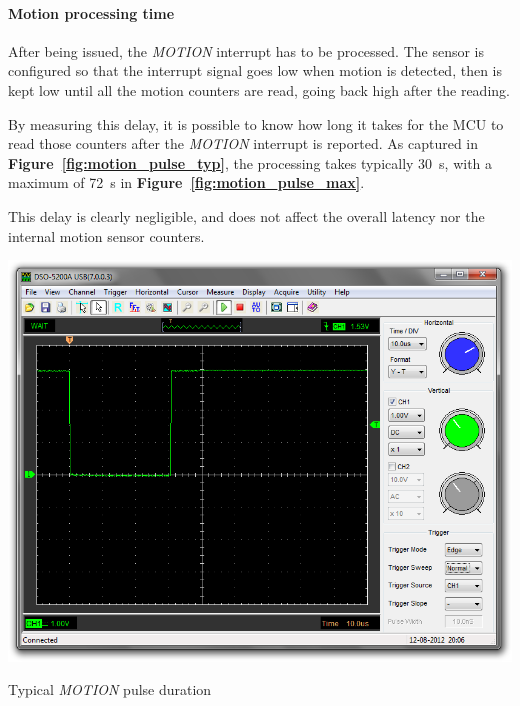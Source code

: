 \documentclass[a4paper,10pt]{article}
\makeatletter
\newenvironment{figurehere}{\def\@captype{figure}\vspace{2ex}}{\vspace{2ex}}
\newcommand{\citef}[1]{\textbf{Figure~\ref{#1}}}
\makeatother
\begin{document}
\begin{multicols}{2}
\paragraph{Motion processing time}
After being issued, the \emph{MOTION} interrupt has to be processed. The
sensor is configured so that the interrupt signal goes low when motion is
detected, then is kept low until all the motion counters are read, going back
high after the reading.

By measuring this delay, it is possible to know how long it takes for the MCU
to read those counters after the \emph{MOTION} interrupt is reported. As
captured in \citef{fig:motion_pulse_typ}, the processing takes typically
30~{\textmu}s, with a maximum of 72~{\textmu}s in \citef{fig:motion_pulse_max}.

This delay is clearly negligible, and does not affect the overall latency nor
the internal motion sensor counters.

\begin{figurehere}
	\centering
	\includegraphics[keepaspectratio=true,width=\columnwidth]{images/motion_pulse_typ.png}
	\caption{Typical \emph{MOTION} pulse duration}
	\label{fig:motion_pulse_typ}
\end{figurehere}


\end{multicols}
\end{document}

